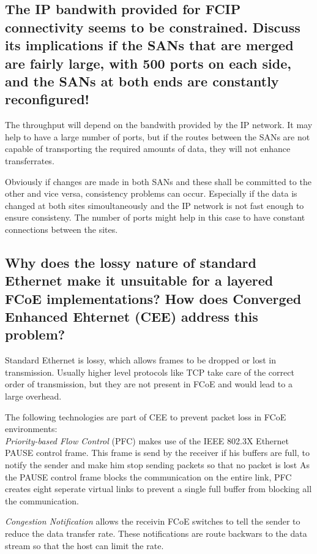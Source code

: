 \documentclass{article}
\begin{document}
\subsection{The IP bandwith provided for FCIP connectivity seems to be constrained.
	Discuss its implications if the SANs that are merged are fairly large,
	with 500 ports on each side, and the SANs at both ends are constantly reconfigured!}

	The throughput will depend on the bandwith provided by the IP network.
	It may help to have a large number of ports,
	but if the routes between the SANs are not capable of transporting 
	the required amounts of data,
	they will not enhance transferrates.

	Obviously if changes are made in both SANs
	and these shall be committed to the other and vice versa,
	consistency problems can occur.
	Especially if the data is changed at both sites simoultaneously
	and the IP network is not fast enough to ensure consisteny.
	The number of ports might help in this case to have constant connections between the sites.

\subsection{Why does the lossy nature of standard Ethernet make it unsuitable for a layered FCoE implementations?
	How does Converged Enhanced Ehternet (CEE) address this problem?}
	Standard Ethernet is lossy,
	which allows frames to be dropped or lost in transmission.
	Usually higher level protocols like TCP take care of the correct order of transmission,
	but they are not present in FCoE and would lead to a large overhead.

	The following technologies are part of CEE to prevent packet loss in FCoE environments:\\
	\emph{Priority-based Flow Control} (PFC) makes use of the IEEE 802.3X Ethernet PAUSE control frame.
	This frame is send by the receiver if his buffers are full,
	to notify the sender and make him stop sending packets
	so that no packet is lost
	As the PAUSE control frame blocks the communication on the entire link,
	PFC creates eight seperate virtual links to prevent a single full buffer from blocking
	all the communication.

	\emph{Congestion Notification} allows the receivin FCoE switches to tell the sender to
	reduce the data transfer rate.
	These notifications are route backwars to the data stream so that the host can limit the rate.
\end{document}
